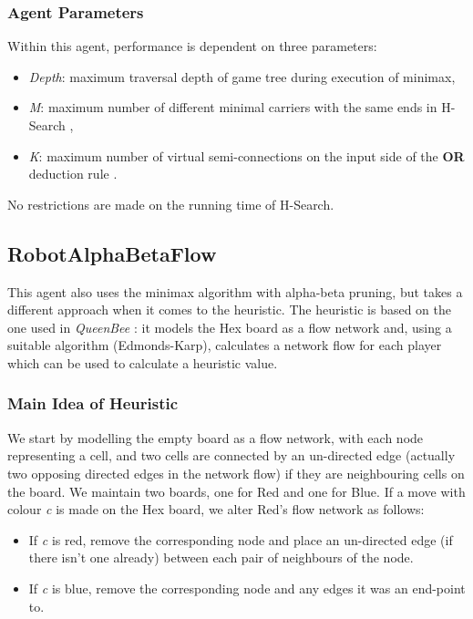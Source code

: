 \subsubsection{Agent Parameters}
Within this agent, performance is dependent on three parameters:

\begin{itemize}
    \item \textit{Depth}: maximum traversal depth of game tree during execution of minimax,
    \item \textit{M}: maximum number of different minimal carriers with the same ends in H-Search \cite{HierarchicalHex},
    \item \textit{K}: maximum number of virtual semi-connections on the input side of the \textbf{OR} deduction rule \cite{HierarchicalHex}.
\end{itemize}

No restrictions are made on the running time of H-Search.

\subsection{RobotAlphaBetaFlow}

This agent also uses the minimax algorithm with alpha-beta pruning, but takes a different approach when it comes to the heuristic. The heuristic is based on the one used in \textit{QueenBee} \cite{queenbee}: it models the Hex board as a flow network and, using a suitable algorithm (Edmonds-Karp), calculates a network flow for each player which can be used to calculate a heuristic value.


\subsubsection{Main Idea of Heuristic}
We start by modelling the empty board as a flow network, with each node representing a cell, and two cells are connected by an un-directed edge (actually two opposing directed edges in the network flow) if they are neighbouring cells on the board. We maintain two boards, one for Red and one for Blue. If a move with colour \textit{c} is made on the Hex board, we alter Red's flow network as follows:

\begin{itemize}
    \item If \textit{c} is red, remove the corresponding node and place an un-directed edge (if there isn't one already) between each pair of neighbours of the node.
    \item If \textit{c} is blue, remove the corresponding node and any edges it was an end-point to.
\end{itemize}

